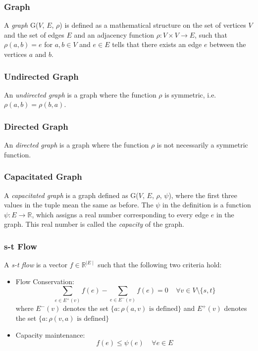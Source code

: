 \documentclass[BTech]{iitmdiss}
\begin{document}
      \subsubsection{Graph}
      A \textit{graph} G($V$, $E$, $\rho$) is defined as a mathematical structure on the set of vertices $V$ and the set of edges $E$ and an adjacency
      function $\rho : V \times V \rightarrow E$, such that $\rho(a,b) = e$ for $a,b \in V$ and $e \in E$ tells that there exists an edge $e$ between 
      the vertices $a$ and $b$.
      
      \subsubsection{Undirected Graph}
	An \textit{undirected graph} is a graph where the function $\rho$ is symmetric, i.e. $\rho(a,b) = \rho(b,a)$.
 
      \subsubsection{Directed Graph}
	An \textit{directed graph} is a graph where the function $\rho$ is not necessarily a symmetric function.
	
      \subsubsection{Capacitated Graph}
	A \textit{capacitated graph} is a graph defined as G($V$, $E$, $\rho$, $\psi$), where the first three values in the tuple mean the same as before.
	The $\psi$ in the definition is a function $\psi: E \rightarrow \mathbb{R}$, which assigns a real number corresponding to every edge $e$ in the 
	graph. This real number is called the \textit{capacity} of the graph.
      
      \subsubsection{s-t Flow}
	A \textit{s-t flow} is a vector $f \in \mathbb{R}^{\mid E \mid}$ such that the following two criteria hold:
	\begin{itemize}
	 \item 
	   Flow Conservation: $$\displaystyle\sum_{e \in E^+(v)} f(e)- \displaystyle\sum_{e \in E^-(v)} f(e) = 0 ~~~~~ \forall v \in V \setminus \{s,t\}$$
	   where $E^-(v)$ denotes the set $\{a: \rho(a,v) \text{ is defined}\}$ and $E^+(v)$ denotes the set $\{a: \rho(v,a) \text{ is defined}\}$
	 \item
	  Capacity maintenance:
	    $$f(e) \leq \psi(e)~~~~~\forall e \in E$$
	      
	\end{itemize}
	
\end{document}
